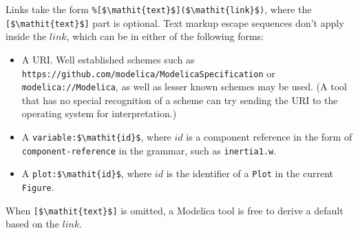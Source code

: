Links take the form \lstinline!%[$\mathit{text}$]($\mathit{link}$)!, where the \lstinline![$\mathit{text}$]! part is optional.  Text markup escape sequences don't apply inside the $\mathit{link}$, which can be in either of the following forms:
\begin{itemize}
\item A URI.  Well established schemes such as \lstinline[language={[nocomment]modelica}]!https://github.com/modelica/ModelicaSpecification! or \lstinline[language={[nocomment]modelica}]!modelica://Modelica!, as well as lesser known schemes may be used.  (A tool that has no special recognition of a scheme can try sending the URI to the operating system for interpretation.)
\item A \lstinline!variable:$\mathit{id}$!, where $\mathit{id}$ is a component reference in the form of \lstinline[language=grammar]!component-reference! in the grammar, such as \lstinline!inertia1.w!.
\item A \lstinline!plot:$\mathit{id}$!, where $\mathit{id}$ is the identifier of a \lstinline!Plot! in the current \lstinline!Figure!.
\end{itemize}

When \lstinline![$\mathit{text}$]! is omitted, a Modelica tool is free to derive a default based on the $\mathit{link}$.


